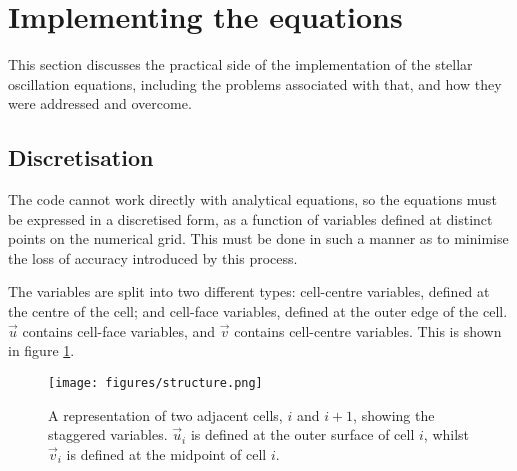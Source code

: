 \documentclass[11pt]{amsart}
\begin{document}
\section{Implementing the equations}  \label{Implement}

This section discusses the practical side of the implementation of the stellar oscillation equations, including the problems associated with that, and how they were addressed and overcome.





\subsection{Discretisation}   \label{Implement:Disc}

The code cannot work directly with analytical equations, so the equations must be expressed in a discretised form, as a function of variables defined at distinct points on the numerical grid.  This must be done in such a manner as to minimise the loss of accuracy introduced by this process.

The variables are split into two different types: cell-centre variables, defined at the centre of the cell; and cell-face variables, defined at the outer edge of the cell.  $\vec{u}$ contains cell-face variables, and $\vec{v}$ contains cell-centre variables.  This is shown in figure \ref{fig:structure}.


\begin{figure}
\begin{center}
\texttt{[image: figures/structure.png]}
\caption{A representation of two adjacent cells, $i$ and $i+1$, showing the staggered variables.  $\vec{u}_{i}$ is defined at the outer surface of cell $i$, whilst $\vec{v}_{i}$ is defined at the midpoint of cell $i$.}
\label{fig:structure}
\end{center}
\end{figure}
\end{document}
